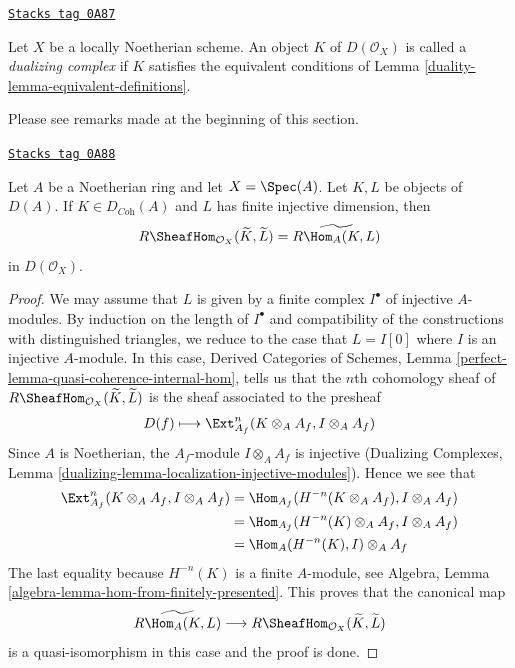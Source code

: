 \begin{definition}
\label{duality-definition-dualizing-scheme}
\href{https://stacks.math.columbia.edu/tag/0A87}{\texttt{Stacks tag 0A87}}

Let $X$ be a locally Noetherian scheme. An object $K$ of
$D(\mathcal{O}_X)$ is called a {\it dualizing complex} if
$K$ satisfies the equivalent conditions of
Lemma \ref{duality-lemma-equivalent-definitions}.
\end{definition}

Please see remarks made at the beginning of this section.

\begin{lemma}
\label{duality-lemma-affine-duality}
\href{https://stacks.math.columbia.edu/tag/0A88}{\texttt{Stacks tag 0A88}}

Let $A$ be a Noetherian ring and let $X = \Spec(A)$. Let $K, L$ be objects
of $D(A)$. If $K \in D_{\textit{Coh}}(A)$ and $L$ has finite injective
dimension, then
$$
R\SheafHom_{\mathcal{O}_X}(\widetilde{K}, \widetilde{L})
=
\widetilde{R\Hom_A(K, L)}
$$
in $D(\mathcal{O}_X)$.
\end{lemma}

\begin{proof}
We may assume that $L$ is given by a finite complex $I^\bullet$
of injective $A$-modules. By induction on the length of $I^\bullet$
and compatibility of the constructions with distinguished triangles,
we reduce to the case that $L = I[0]$ where $I$ is an injective $A$-module.
In this case, Derived Categories of Schemes, Lemma
\ref{perfect-lemma-quasi-coherence-internal-hom}, tells us that
the $n$th cohomology sheaf of
$R\SheafHom_{\mathcal{O}_X}(\widetilde{K}, \widetilde{L})$
is the sheaf associated to the presheaf
$$
D(f) \longmapsto \Ext^n_{A_f}(K \otimes_A A_f, I \otimes_A A_f)
$$
Since $A$ is Noetherian, the $A_f$-module $I \otimes_A A_f$ is injective
(Dualizing Complexes, Lemma
\ref{dualizing-lemma-localization-injective-modules}). Hence we see that
\begin{align*}
\Ext^n_{A_f}(K \otimes_A A_f, I \otimes_A A_f)
& =
\Hom_{A_f}(H^{-n}(K \otimes_A A_f), I \otimes_A A_f) \\
& =
\Hom_{A_f}(H^{-n}(K) \otimes_A A_f, I \otimes_A A_f) \\
& =
\Hom_A(H^{-n}(K), I) \otimes_A A_f
\end{align*}
The last equality because $H^{-n}(K)$ is a finite $A$-module, see
Algebra, Lemma \ref{algebra-lemma-hom-from-finitely-presented}.
This proves that the canonical map
$$
\widetilde{R\Hom_A(K, L)}
\longrightarrow
R\SheafHom_{\mathcal{O}_X}(\widetilde{K}, \widetilde{L})
$$
is a quasi-isomorphism in this case and the proof is done.
\end{proof}

